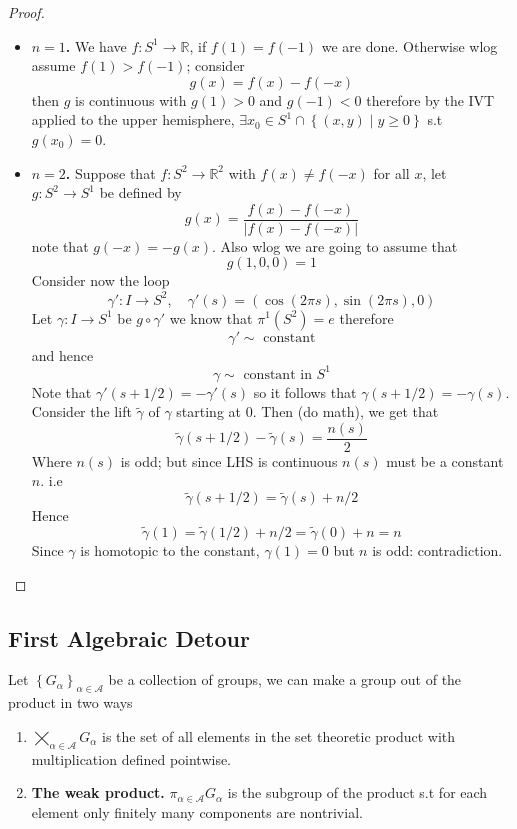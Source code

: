 \documentclass[11pt,a4paper]{article}
\theoremstyle{definition}
\theoremstyle{plain}
\theoremstyle{remark}
\newcommand{\R}{\mathbb{R}}
\renewcommand{\set}[1]{\left\{ #1 \right\}}
\newcommand{\abs}[1]{\lvert #1 \rvert}
\newcommand{\1}{\mathbbm{1}}
\begin{document}
\begin{proof}
    \begin{itemize}
        \item \textbf{$n=1$.} We have $f \colon S^1 \to \R$, if $f(1) = f(-1)$ we are done. Otherwise wlog assume $f(1) > f(-1)$; consider 
        $$g(x) = f(x) - f(-x)$$
        then $g$ is continuous with $g(1) > 0$ and $g(-1) < 0$ therefore  by the IVT applied to the upper hemisphere, $\exists x_0 \in S^1 \cap \set{(x,y) \mid y \ge 0}$ s.t 
        $g(x_0) = 0$.
        
        \item \textbf{$n=2$.} Suppose that $f \colon S^2 \to \R^2$ with $f(x) \ne f(-x)$ for all $x$, let $g \colon S^2 \to S^1$ be defined by 
        $$g(x) = \frac{f(x) - f(-x)}{\abs{f(x) - f(-x)}}$$
        note that $g(-x) = - g(x)$. Also wlog we are going to assume that 
        $$g(1,0,0) = 1$$
        Consider now the loop 
        $$\gamma' \colon I \to S^2, \quad \gamma'(s) = (\cos (2\pi s), \sin (2\pi s), 0)$$
        Let $\gamma \colon I \to S^1$ be $g \circ \gamma'$ we know that $\pi^1 (S^2) = e$ therefore 
        $$\gamma' \sim \text{ constant}$$
        and hence 
        $$\gamma \sim \text{ constant in $S^1$}$$
        Note that $\gamma'(s + 1/2) = - \gamma'(s)$ so it follows that $\gamma(s + 1/2) = - \gamma(s)$. Consider the lift $\tilde \gamma$ of $\gamma$ starting at $0$. 
        Then (do math), we get that 
        $$\tilde \gamma(s + 1/2) - \tilde \gamma (s) = \frac{n(s)}{2}$$   
        Where $n(s)$ is odd; but since LHS is continuous $n(s)$ must be a constant $n$. i.e 
        $$\tilde \gamma(s+1/2) = \tilde \gamma (s) + n/2$$
        Hence 
        $$\tilde \gamma(1) = \tilde \gamma(1/2) + n/2 = \tilde \gamma(0) + n = n$$
        Since $\gamma$ is homotopic to the constant, $\gamma(1) = 0$ but $n$ is odd: contradiction. 
    \end{itemize}
\end{proof}

\subsection{First Algebraic Detour}
Let $\set{G_\alpha}_{\alpha \in \mathcal{A}}$ be a collection of groups, we can make a group out of the product in two ways 
\begin{enumerate}
    \item $\bigtimes_{\alpha \in \mathcal{A}} G_\alpha$ is the set of all elements in the set theoretic product with multiplication defined pointwise. 
    \item \textbf{The weak product.} $\pi_{\alpha \in \mathcal{A}} G_\alpha$ is the subgroup of the product s.t for each element only finitely many components are 
    nontrivial.
\end{enumerate}
\end{document}
